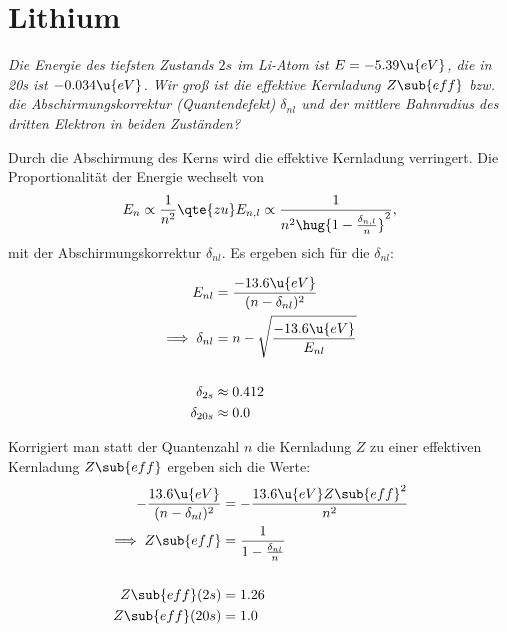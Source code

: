 \documentclass[ex,minted]{exercise_4.0}
\begin{document}
\section{Lithium}
{\it Die Energie des tiefsten Zustands \(2s\) im Li-Atom ist \(E=-5.39 \u{eV}\), die in 20s ist \(-0.034\u{eV}\). Wir groß ist die effektive Kernladung \(Z\sub{eff}\) bzw. die Abschirmungskorrektur (Quantendefekt) \(\delta_{nl}\) und der mittlere Bahnradius des dritten Elektron in beiden Zuständen?}

\dottedlinett

Durch die Abschirmung des Kerns wird die effektive Kernladung verringert. Die Proportionalität der Energie wechselt von 
\begin{align*}
    E_n\propto \frac{1}{n^2}\qte{zu} E_{n,l} \propto \frac{1}{n^2\hug{1-\frac{\delta_{n,l}}{n}}^2},
\end{align*}
mit der Abschirmungskorrektur \(\delta_{nl}\). Es ergeben sich für die \(\delta_{nl}\):

\begin{align*}
    E_{nl} &= \frac{-13.6\u{eV}}{(n-\delta_{nl})^2}\\
    \implies \delta_{nl} &= n - \sqrt{\frac{-13.6\u{eV}}{E_{nl}}}\\
    \\
    \delta_{2s}&\approx 0.412\\
    \delta_{20s}&\approx 0.0\\
\end{align*}

Korrigiert man statt der Quantenzahl \(n\) die Kernladung \(Z\) zu einer effektiven Kernladung \(Z\sub{eff}\) ergeben sich die Werte:
\begin{align*}
    -\frac{13.6\u{eV}}{(n-\delta_{nl})^2} &= -\frac{13.6\u{eV}Z\sub{eff}^2}{n^2}\\
    \implies Z\sub{eff} &= \frac{1}{1-\frac{\delta_{nl}}{n}}\\
    \\
    Z\sub{eff}(2s) &= 1.26\\
    Z\sub{eff}(20s) &= 1.0
\end{align*}
\end{document}
